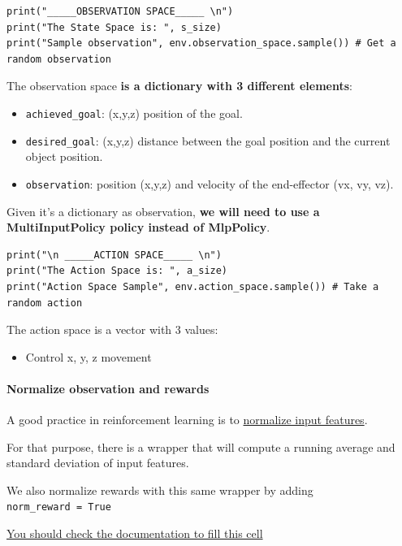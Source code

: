 \documentclass[11pt,a4paper]{article}
\begin{document}
\begin{lstlisting}
print("_____OBSERVATION SPACE_____ \n")
print("The State Space is: ", s_size)
print("Sample observation", env.observation_space.sample()) # Get a random observation
\end{lstlisting}

The observation space \textbf{is a dictionary with 3 different elements}:

\begin{itemize}
\tightlist
\item
  \texttt{achieved\_goal}: (x,y,z) position of the goal.
\item
  \texttt{desired\_goal}: (x,y,z) distance between the goal position and the current object position.
\item
  \texttt{observation}: position (x,y,z) and velocity of the end-effector (vx, vy, vz).
\end{itemize}

Given it's a dictionary as observation, \textbf{we will need to use a MultiInputPolicy policy instead of MlpPolicy}.

\begin{lstlisting}
print("\n _____ACTION SPACE_____ \n")
print("The Action Space is: ", a_size)
print("Action Space Sample", env.action_space.sample()) # Take a random action
\end{lstlisting}

The action space is a vector with 3 values:

\begin{itemize}
\tightlist
\item
  Control x, y, z movement
\end{itemize}

\paragraph{Normalize observation and rewards}\label{normalize-observation-and-rewards}

A good practice in reinforcement learning is to \href{https://stable-baselines3.readthedocs.io/en/master/guide/rl_tips.html}{normalize input features}.

For that purpose, there is a wrapper that will compute a running average and standard deviation of input features.

We also normalize rewards with this same wrapper by adding \texttt{norm\_reward\ =\ True}

\href{https://stable-baselines3.readthedocs.io/en/master/guide/vec_envs.html\#vecnormalize}{You should check the documentation to fill this cell}
\end{document}
